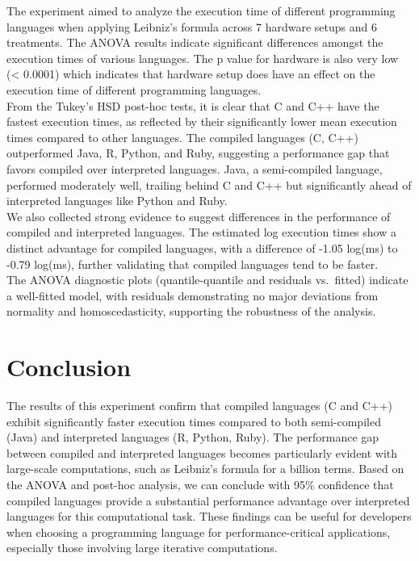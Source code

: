\documentclass[12pt,halfline,a4paper,]{ouparticle}
\begin{document}
The experiment aimed to analyze the execution time of different
programming languages when applying Leibniz's formula across 7 hardware
setups and 6 treatments. The ANOVA results indicate significant
differences amongst the execution times of various languages. The p
value for hardware is also very low (\textless{} 0.0001) which indicates
that hardware setup does have an effect on the execution time of
different programming languages.\\
From the Tukey's HSD post-hoc tests, it is clear that C and C++ have the
fastest execution times, as reflected by their significantly lower mean
execution times compared to other languages. The compiled languages (C,
C++) outperformed Java, R, Python, and Ruby, suggesting a performance
gap that favors compiled over interpreted languages. Java, a
semi-compiled language, performed moderately well, trailing behind C and
C++ but significantly ahead of interpreted languages like Python and
Ruby.\\
We also collected strong evidence to suggest differences in the
performance of compiled and interpreted languages. The estimated log
execution times show a distinct advantage for compiled languages, with a
difference of -1.05 log(ms) to -0.79 log(ms), further validating that
compiled languages tend to be faster.\\
The ANOVA diagnostic plots (quantile-quantile and residuals vs.~fitted)
indicate a well-fitted model, with residuals demonstrating no major
deviations from normality and homoscedasticity, supporting the
robustness of the analysis.\\

\section{Conclusion}\label{conclusion}

The results of this experiment confirm that compiled languages (C and
C++) exhibit significantly faster execution times compared to both
semi-compiled (Java) and interpreted languages (R, Python, Ruby). The
performance gap between compiled and interpreted languages becomes
particularly evident with large-scale computations, such as Leibniz's
formula for a billion terms. Based on the ANOVA and post-hoc analysis,
we can conclude with 95\% confidence that compiled languages provide a
substantial performance advantage over interpreted languages for this
computational task. These findings can be useful for developers when
choosing a programming language for performance-critical applications,
especially those involving large iterative computations.
\end{document}
